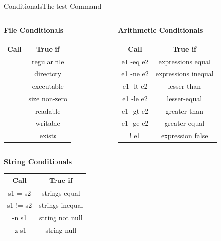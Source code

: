 \documentclass{beamer}
\begin{document}
\begin{frame}[fragile]{Conditionals}{The test Command}
  \begin{columns}
    \begin{column}{0.5\textwidth}
      \begin{center}
        \textbf{File Conditionals}\\
        \begin{tabular}{|c|c|}
          \hline \textbf{Call}&\textbf{True if}\\\hline
          [ -f file ]&regular file\\\hline
          [ -d file ]&directory\\\hline
          [ -x file ]&executable\\\hline
          [ -s file ]&size non-zero\\\hline
          [ -r file ]&readable\\\hline
          [ -w file ]&writable\\\hline
          [ -e file ]&exists\\\hline
        \end{tabular}
      \end{center}
    \end{column}
    \begin{column}{0.5\textwidth}
      \begin{center}
        \textbf{Arithmetic Conditionals}\\
        \begin{tabular}{|c|c|}
          \hline \textbf{Call}&\textbf{True if}\\\hline
          e1 -eq e2 & expressions equal\\\hline
          e1 -ne e2 & expressions inequal\\\hline
          e1 -lt e2 & lesser than\\\hline
          e1 -le e2 & lesser-equal\\\hline
          e1 -gt e2 & greater than\\\hline
          e1 -ge e2 & greater-equal\\\hline
          ! e1 & expression false\\\hline
        \end{tabular}
      \end{center}
    \end{column}
  \end{columns}
  \begin{center}
    \textbf{String Conditionals}\\
    \begin{tabular}{|c|c|}
      \hline \textbf{Call}&\textbf{True if}\\\hline
      s1 = s2 & strings equal\\\hline
      s1 != s2 & strings inequal\\\hline
      -n s1 & string not null\\\hline
      -z s1 & string null\\\hline
    \end{tabular}\\
  \end{center}
\end{frame}
\end{document}
